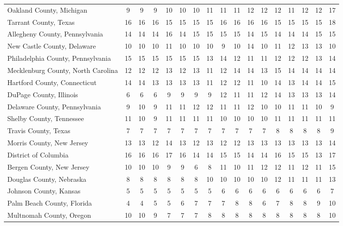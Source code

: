 \begin{landscape}
\begin{longtable}{lcccccccccccccccc}
		Oakland County, Michigan & 9 & 9 & 9 & 10 & 10 & 10 & 11 & 11 & 11 & 12 & 12 & 12 & 11 & 12 & 12 & 17 \\
		Tarrant County, Texas & 16 & 16 & 16 & 15 & 15 & 15 & 15 & 16 & 16 & 16 & 16 & 15 & 15 & 15 & 15 & 18 \\
		Allegheny County, Pennsylvania & 14 & 14 & 14 & 16 & 14 & 15 & 15 & 15 & 15 & 14 & 15 & 14 & 14 & 14 & 15 & 15 \\
		New Castle County, Delaware & 10 & 10 & 10 & 11 & 10 & 10 & 10 & 9 & 10 & 14 & 10 & 11 & 12 & 13 & 13 & 10 \\
		Philadelphia County, Pennsylvania & 15 & 15 & 15 & 15 & 15 & 15 & 13 & 14 & 12 & 11 & 11 & 12 & 12 & 12 & 13 & 14 \\
		Mecklenburg County, North Carolina & 12 & 12 & 12 & 13 & 12 & 13 & 11 & 12 & 14 & 14 & 13 & 15 & 14 & 14 & 14 & 14 \\
		Hartford County, Connecticut & 14 & 14 & 13 & 13 & 13 & 13 & 11 & 12 & 12 & 11 & 10 & 14 & 13 & 14 & 14 & 15 \\
		DuPage County, Illinois & 6 & 6 & 6 & 9 & 9 & 9 & 9 & 12 & 11 & 11 & 12 & 14 & 13 & 13 & 13 & 14 \\
		Delaware County, Pennsylvania & 9 & 10 & 9 & 11 & 11 & 12 & 12 & 11 & 11 & 12 & 10 & 10 & 11 & 11 & 10 & 9 \\
		Shelby County, Tennessee & 11 & 10 & 9 & 11 & 11 & 11 & 11 & 10 & 10 & 10 & 10 & 11 & 11 & 11 & 11 & 11 \\
		Travis County, Texas & 7 & 7 & 7 & 7 & 7 & 7 & 7 & 7 & 7 & 7 & 7 & 8 & 8 & 8 & 8 & 9 \\
		Morris County, New Jersey & 13 & 13 & 12 & 14 & 13 & 12 & 13 & 12 & 12 & 13 & 13 & 13 & 13 & 13 & 13 & 14 \\
		District of Columbia & 16 & 16 & 16 & 17 & 16 & 14 & 14 & 15 & 15 & 14 & 14 & 16 & 15 & 15 & 13 & 17 \\
		Bergen County, New Jersey & 10 & 10 & 10 & 9 & 9 & 6 & 8 & 11 & 10 & 11 & 12 & 12 & 11 & 12 & 11 & 15 \\
		Douglas County, Nebraska & 8 & 8 & 8 & 8 & 8 & 8 & 10 & 10 & 10 & 10 & 10 & 12 & 11 & 11 & 11 & 13 \\
		Johnson County, Kansas & 5 & 5 & 5 & 5 & 5 & 5 & 5 & 6 & 6 & 6 & 6 & 6 & 6 & 6 & 6 & 7 \\
		Palm Beach County, Florida & 4 & 4 & 5 & 5 & 6 & 7 & 7 & 7 & 8 & 8 & 6 & 7 & 8 & 8 & 9 & 10 \\
		Multnomah County, Oregon & 10 & 10 & 9 & 7 & 7 & 7 & 8 & 8 & 8 & 8 & 8 & 8 & 8 & 8 & 8 & 10 \\

\end{longtable}
\end{landscape}

